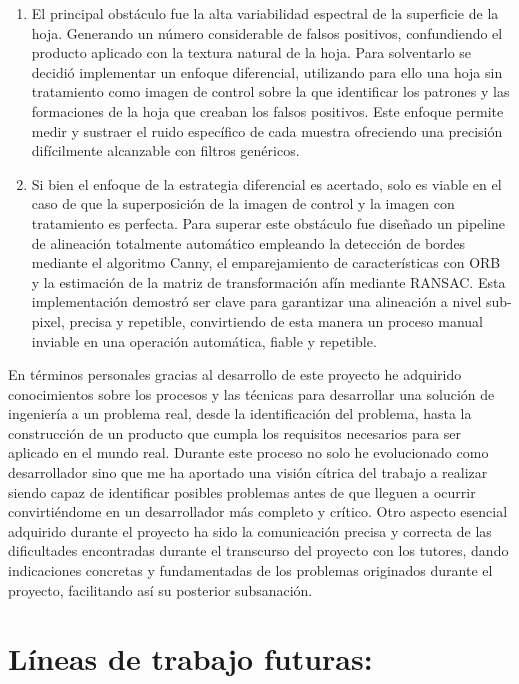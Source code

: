 \begin{enumerate}

\item El principal obstáculo fue la alta variabilidad espectral de la superficie de la hoja. Generando un número considerable de falsos positivos, confundiendo el producto aplicado con la textura natural de la hoja. Para solventarlo  se decidió implementar un enfoque diferencial, utilizando para ello una hoja sin tratamiento como imagen de control sobre la que identificar los patrones y las formaciones de la hoja que creaban los falsos positivos. Este enfoque permite medir y sustraer el ruido específico de cada muestra ofreciendo una precisión difícilmente alcanzable con filtros genéricos.

\item Si bien el enfoque de la estrategia diferencial es acertado, solo es viable en el caso de que la superposición de la imagen de control y la imagen con tratamiento es perfecta. Para superar este obstáculo fue diseñado un pipeline de alineación totalmente automático empleando la detección de bordes mediante el algoritmo Canny, el emparejamiento de características con ORB y la estimación de la matriz de transformación afín mediante RANSAC. Esta implementación demostró ser clave para garantizar una alineación a nivel sub-pixel, precisa y repetible, convirtiendo de esta manera un  proceso manual inviable en una operación automática, fiable y repetible.
\end{enumerate}


En términos personales gracias al desarrollo de este proyecto he adquirido conocimientos sobre los procesos y las técnicas para desarrollar una solución de ingeniería a un problema real, desde la identificación del problema, hasta la construcción de un producto que cumpla los requisitos necesarios para ser aplicado en el mundo real. Durante este proceso no solo he evolucionado como desarrollador sino que me ha aportado una visión cítrica del trabajo a realizar siendo capaz de identificar posibles problemas antes de que lleguen a ocurrir convirtiéndome en un desarrollador más completo y crítico.
Otro aspecto esencial adquirido durante el proyecto ha sido la comunicación precisa y correcta de las dificultades encontradas durante el transcurso del proyecto con los tutores, dando indicaciones concretas y fundamentadas de los problemas originados durante el proyecto, facilitando así su posterior subsanación.



\section{Líneas de trabajo futuras:}

